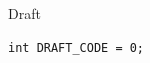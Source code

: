 \documentclass[aspectratio=169,10pt]{beamer}
\begin{document}
\begin{frame}[fragile]{Draft}
	\begin{lstlisting}[file=src/DRAFT_PATH.cpp]
int DRAFT_CODE = 0;
	\end{lstlisting}
\end{frame}
\end{document}
